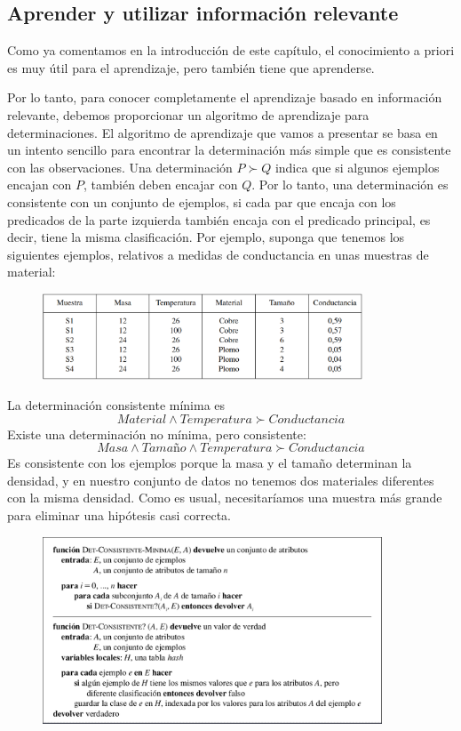 \documentclass[12 pt, a4paper]{article}
\begin{document}
		\subsection{Aprender y utilizar información relevante}
			Como ya comentamos en la introducción de este capítulo, el conocimiento a priori es muy útil para el aprendizaje, pero también tiene que aprenderse. 
			
			Por lo tanto, para conocer completamente el aprendizaje basado en información relevante, debemos proporcionar un algoritmo de aprendizaje para determinaciones. El algoritmo de aprendizaje que vamos a presentar se basa en un intento sencillo para encontrar la determinación más simple que es consistente con las observaciones. Una determinación $P \succ Q$ indica que si algunos ejemplos encajan con $P$, también deben encajar con $Q$. Por lo tanto, una determinación es consistente con un conjunto de ejemplos, si cada par que encaja con los predicados de la parte izquierda también encaja con el predicado principal, es decir, tiene la misma clasificación. Por ejemplo, suponga que tenemos los siguientes ejemplos, relativos a medidas de conductancia en unas muestras de material:	
				\begin{figure}[h]
					\centering
					\includegraphics[width=0.85\textwidth]{./section3/fig1.png}
				\end{figure}
				
			La determinación consistente mínima es 
				$$Material \land Temperatura \succ Conductancia$$
			Existe una determinación no mínima, pero consistente: 
			$$Masa \land \textit{Tamaño} \land Temperatura \succ Conductancia$$
			Es consistente con los ejemplos porque la masa y el tamaño determinan la densidad, y en nuestro conjunto de datos no tenemos dos materiales diferentes con la misma densidad. Como es usual, necesitaríamos una muestra más grande para eliminar una hipótesis casi correcta.
				\begin{figure}[h]
					\centering
					\includegraphics[width=0.9\textwidth]{./section3/fig2.png}
				\end{figure}
			
\end{document}
